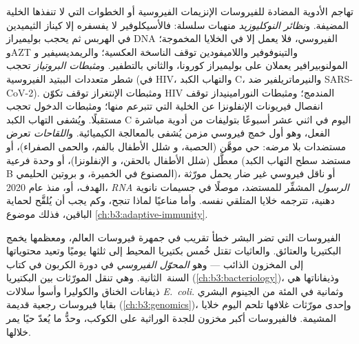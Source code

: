 \begin{definition}\label{def:b3:virology:drugs}
تهاجم الأدوية المضادة للفيروسات الإنزيمات الفيروسية أو الخطوات التي لا تنفذها
الخلية المضيفة. و\emph{نظائر النوكليوزيد} منهيات سلسلة: فالأسيكلوفير
لا يفسفره إلا كيناز الثيميدين في  الهربس ثم
يحجب بوليميراز DNA الفيروسي، فلا يعمل إلا في الخلايا المخموجة؛
وAZT والتينوفوفير واللاميفودين توقف الناسخة العكسية؛ والريمديسيفير و
المولنوبيرافير يعملان على بوليميراز  كورونا، والثاني
بالتطفير. و\emph{مثبطات البروتياز} تحجب شطر متعددات الببتيد
الفيروسية (في HIV، والتهاب الكبد C، والنيرماتريلفير ضد SARS-CoV-2). ومثبطات
الإنتغراز توقف تكوّن  HIV المندمج؛ ومثبطات النورامينيداز توقف
انفصال فيريونات الإنفلونزا عن الخلية التي تتبرعم منها؛ ومثبطات
الدخول تحجب مستقبلًا. ويُشفى  التهاب الكبد C اليوم في
اثني عشر أسبوعًا بتوليفات من أدوية مباشرة الفعل، وهو أول خمج
فيروسي مزمن يُشفى بالمعالجة الكيميائية. و\emph{اللقاحات} تعرض
مستضدات  بلا مرضه:  حي موهَّن (الحصبة، و
شلل الأطفال بالفم، والحمى الصفراء)، أو  معطَّل (شلل الأطفال بالحقن، و
الإنفلونزا)، أو وحدة فرعية (مستضد سطح التهاب الكبد B المصنوع في الخميرة، و
بروتين    الحليمي)، أو ناقل فيروسي غير ضار يحمل
مورّثة الهدف، أو، منذ عام 2020، \emph{RNA الرسول} المشفِّر
للمستضد، موصلًا في جسيمات نانوية دهنية، تترجمه خلايا
المتلقي نفسه. وأما مناعيًا لماذا تنجح، وكم يجب أن يُلقَّح
لحماية الباقين، فذلك موضوع
\cref{ch:b3:adaptive-immunity}.
\end{definition}

\begin{remark}\label{rem:b3:virology:economy}
الفيروسات التي تضر البشر خطأ تقريب في جمهرة فيروسات
العالم، ومعظمها يخمج البكتيريا والعتائق. والعاثيات تقتل
خُمس بكتيريا المحيط إلى ثلثها يوميًا وتعيد
محتوياتها إلى المخزون الذائب --- وهو \emph{المحوّل الفيروسي} في
دورة الكربون في كتاب السنة~الثانية. وهي تنقل المورّثات بين البكتيريا
(\cref{ch:b3:bacteriology})، وذيفاناتها هي ذيفانات
الخناق والكوليرا وأسوأ سلالات \emph{E.~coli}. وثمانية في المئة من
الجينوم البشري بقايا فيروسات رجعية قديمة
(\cref{ch:b3:genomics})، وإحدى مورّثات غلافها تلحم اليوم
خلايا المشيمة. فالفيروسات أكبر مخزون للجدة
الوراثية على الكوكب، وحدُّ ما يُعدّ حيًا يمر
خلالها.
\end{remark}

